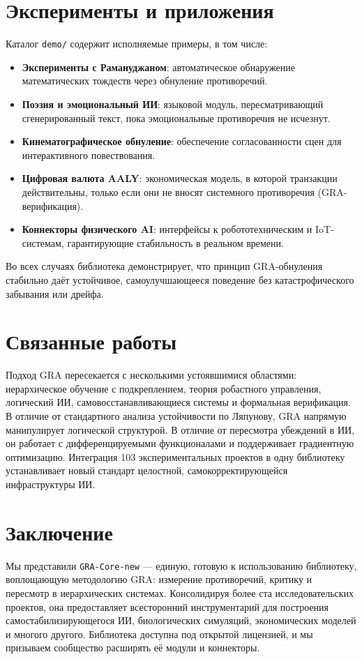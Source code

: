 \documentclass[11pt,a4paper]{article}
\begin{document}
\section{Эксперименты и приложения}
Каталог \texttt{demo/} содержит исполняемые примеры, в том числе:
\begin{itemize}
    \item \textbf{Эксперименты с Рамануджаном}: автоматическое обнаружение математических тождеств через обнуление противоречий.
    \item \textbf{Поэзия и эмоциональный ИИ}: языковой модуль, пересматривающий сгенерированный текст, пока эмоциональные противоречия не исчезнут.
    \item \textbf{Кинематографическое обнуление}: обеспечение согласованности сцен для интерактивного повествования.
    \item \textbf{Цифровая валюта AALY}: экономическая модель, в которой транзакции действительны, только если они не вносят системного противоречия (GRA-верификация).
    \item \textbf{Коннекторы физического AI}: интерфейсы к робототехническим и IoT-системам, гарантирующие стабильность в реальном времени.
\end{itemize}

Во всех случаях библиотека демонстрирует, что принцип GRA-обнуления стабильно даёт устойчивое, самоулучшающееся поведение без катастрофического забывания или дрейфа.

\section{Связанные работы}
Подход GRA пересекается с несколькими устоявшимися областями: иерархическое обучение с подкреплением, теория робастного управления, логический ИИ, самовосстанавливающиеся системы и формальная верификация. В отличие от стандартного анализа устойчивости по Ляпунову, GRA напрямую манипулирует логической структурой. В отличие от пересмотра убеждений в ИИ, он работает с дифференцируемыми функционалами и поддерживает градиентную оптимизацию. Интеграция 103 экспериментальных проектов в одну библиотеку устанавливает новый стандарт целостной, самокорректирующейся инфраструктуры ИИ.

\section{Заключение}
Мы представили \texttt{GRA-Core-new} — единую, готовую к использованию библиотеку, воплощающую методологию GRA: измерение противоречий, критику и пересмотр в иерархических системах. Консолидируя более ста исследовательских проектов, она предоставляет всесторонний инструментарий для построения самостабилизирующегося ИИ, биологических симуляций, экономических моделей и многого другого. Библиотека доступна под открытой лицензией, и мы призываем сообщество расширять её модули и коннекторы.
\end{document}
